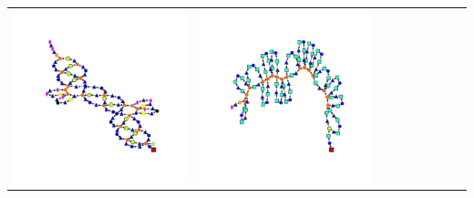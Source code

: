\begin{table}[t!]
\begin{tabular}{p{1.7cm}ccp{0.2cm}ccccc}
		{\includegraphics[width=\width,align=c,trim={2.3cm 3cm 2.3cm 3cm},clip]{dag_ood_nobn_0.pdf}} & 
		{\includegraphics[width=\width,align=c,trim={2.3cm 3cm 2.3cm 3cm},clip]{dag_resnet_50.pdf}} 

\end{tabular}
\end{table}
